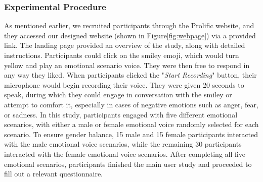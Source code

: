\subsubsection{Experimental Procedure}
As mentioned earlier, we recruited participants through the Prolific website, and they accessed our designed website (shown in Figure\ref{fig:webpage}) via a provided link. The landing page provided an overview of the study, along with detailed instructions. Participants could click on the smiley emoji, which would turn yellow and play an emotional scenario voice. They were then free to respond in any way they liked. When participants clicked the "\textit{Start Recording}" button, their microphone would begin recording their voice. They were given 20 seconds to speak, during which they could engage in conversation with the smiley or attempt to comfort it, especially in cases of negative emotions such as anger, fear, or sadness.
In this study, participants engaged with five different emotional scenarios, with either a male or female emotional voice randomly selected for each scenario. To ensure gender balance, 15 male and 15 female participants interacted with the male emotional voice scenarios, while the remaining 30 participants interacted with the female emotional voice scenarios. After completing all five emotional scenarios, participants finished the main user study and proceeded to fill out a relevant questionnaire.



